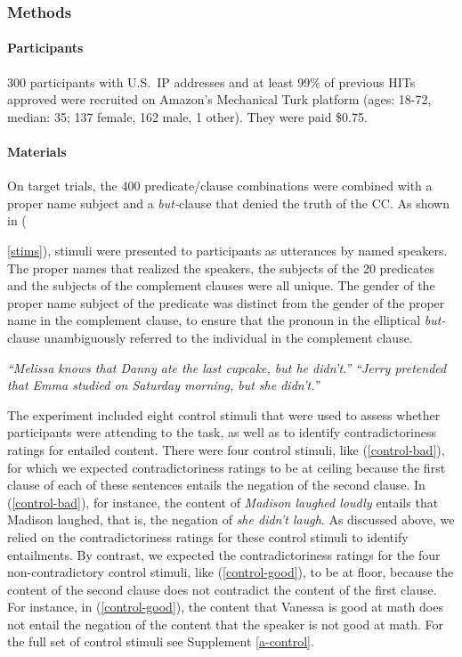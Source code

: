 \documentclass[11pt,fleqn]{article}
\newcommand{\6}{\mbox{$[\hspace*{-.6mm}[$}}
\newcommand{\9}{\mbox{$]\hspace*{-.6mm}]$}}
\begin{document}
\subsubsection{Methods}

\paragraph{Participants} 300 participants with U.S.\ IP addresses and at least 99\% of previous HITs approved were recruited on Amazon's Mechanical Turk platform (ages: 18-72, median: 35; 137 female, 162 male, 1 other). They were paid \$0.75.

\paragraph{Materials} On target trials, the 400 predicate/clause combinations were combined with a proper name subject and a {\em but-}clause that denied the truth of the CC. As shown in ({\ref{stims}), stimuli were presented to participants as utterances by named speakers. The proper names that realized the speakers, the subjects of the 20 predicates and the subjects of the complement clauses were all unique. The gender of the proper name subject of the predicate was distinct from the gender of the proper name in the complement clause, to ensure that the pronoun in the elliptical {\em but-}clause unambiguously referred to the individual in the complement clause.

\begin{exe}
\ex\label{stims}
\begin{xlist}
 {\em ``Melissa knows that Danny ate the last cupcake, but he didn't.''}
 {\em ``Jerry pretended that Emma studied on Saturday morning, but she didn't.''}
\end{xlist}
\end{exe}

The experiment  included eight control stimuli that were used to assess whether participants were attending to the task, as well as to identify contradictoriness ratings for entailed content. There were four control stimuli, like (\ref{control-bad}), for which we expected contradictoriness ratings to be at ceiling because the first clause of each of these sentences entails the negation of the second clause. In (\ref{control-bad}), for instance, the content of {\em Madison laughed loudly} entails that Madison laughed, that is, the negation of {\em she didn't laugh}. As discussed above, we relied on the contradictoriness ratings for these control stimuli to identify entailments. By contrast, we expected the contradictoriness ratings for the four non-contradictory control stimuli, like (\ref{control-good}), to be at floor, because the content of the second clause does not contradict the content of the first clause. For instance, in (\ref{control-good}), the content that Vanessa is good at math does not entail the negation of the content that the speaker is not good at math. For the full set of control stimuli see Supplement \ref{a-control}.

}
\end{document}
